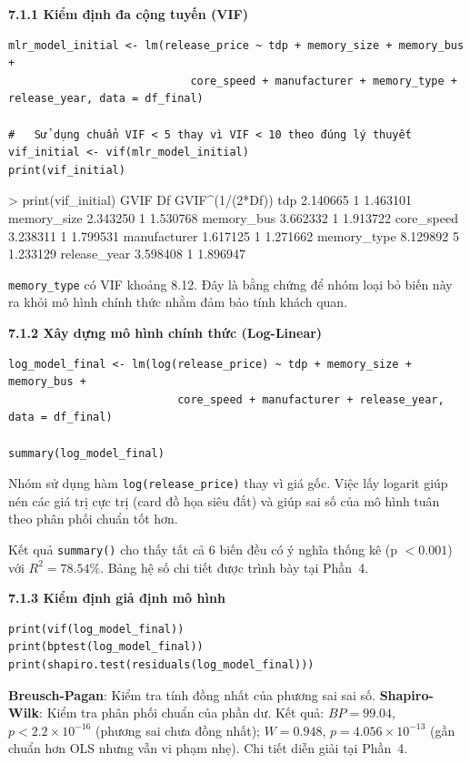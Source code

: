 \documentclass[a4paper]{article}
\begin{document}
\textbf{7.1.1 Kiểm định đa cộng tuyến (VIF)}


\begin{verbatim}
mlr_model_initial <- lm(release_price ~ tdp + memory_size + memory_bus +
                            core_speed + manufacturer + memory_type + release_year, data = df_final)

#   Sử dụng chuẩn VIF < 5 thay vì VIF < 10 theo đúng lý thuyết
vif_initial <- vif(mlr_model_initial)
print(vif_initial)
\end{verbatim}

\begin{rconsole}
> print(vif_initial)
                  GVIF Df GVIF^(1/(2*Df))
tdp           2.140665  1        1.463101
memory_size   2.343250  1        1.530768
memory_bus    3.662332  1        1.913722
core_speed    3.238311  1        1.799531
manufacturer  1.617125  1        1.271662
memory_type   8.129892  5        1.233129
release_year  3.598408  1        1.896947
\end{rconsole}

\texttt{memory\_type} có VIF khoảng 8.12. Đây là bằng chứng để nhóm loại bỏ biến này ra khỏi mô hình chính thức nhằm đảm bảo tính khách quan.

\textbf{7.1.2 Xây dựng mô hình chính thức (Log-Linear)}


\begin{verbatim}
log_model_final <- lm(log(release_price) ~ tdp + memory_size + memory_bus +
                          core_speed + manufacturer + release_year, data = df_final)

summary(log_model_final)
\end{verbatim}

Nhóm sử dụng hàm \texttt{log(release\_price)} thay vì giá gốc. Việc lấy logarit giúp nén các giá trị cực trị (card đồ họa siêu đắt) và giúp sai số của mô hình tuân theo phân phối chuẩn tốt hơn.

Kết quả \texttt{summary()} cho thấy tất cả 6 biến đều có ý nghĩa thống kê (p $< 0.001$) với $R^2 = 78.54\%$. Bảng hệ số chi tiết được trình bày tại Phần~4.

\textbf{7.1.3 Kiểm định giả định mô hình}


\begin{verbatim}
print(vif(log_model_final))
print(bptest(log_model_final))
print(shapiro.test(residuals(log_model_final)))
\end{verbatim}

\textbf{Breusch-Pagan}: Kiểm tra tính đồng nhất của phương sai sai số. \textbf{Shapiro-Wilk}: Kiểm tra phân phối chuẩn của phần dư. Kết quả: $BP = 99.04$, $p < 2.2 \times 10^{-16}$ (phương sai chưa đồng nhất); $W = 0.948$, $p = 4.056 \times 10^{-13}$ (gần chuẩn hơn OLS nhưng vẫn vi phạm nhẹ). Chi tiết diễn giải tại Phần~4.
\end{document}
